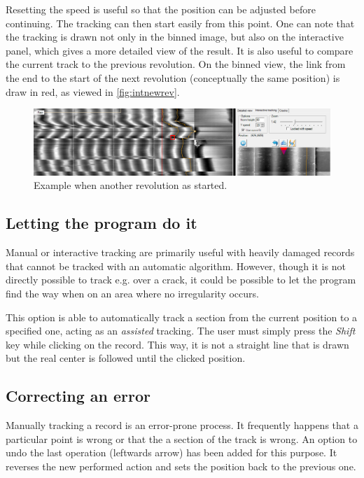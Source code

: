 Resetting the speed is useful so that the position can be adjusted before continuing. The tracking can then start easily from this point. One can note that the tracking is drawn not only in the binned image, but also on the interactive panel, which gives a more detailed view of the result. It is also useful to compare the current track to the previous revolution. On the binned view, the link from the end to the start of the next revolution (conceptually the same position) is draw in red, as viewed in \autoref{fig:intnewrev}.

\begin{figure}[!ht]
\centering
\includegraphics[width=1.0\textwidth]{images/int-new-rev}
\caption{Example when another revolution as started.}
\label{fig:intnewrev}
\end{figure}

\subsection{Letting the program do it}
\label{sec:assistracking}

Manual or interactive tracking are primarily useful with heavily damaged records that cannot be tracked with an automatic algorithm. However, though it is not directly possible to track e.g. over a crack, it could be possible to let the program find the way when on an area where no irregularity occurs.

This option is able to automatically track a section from the current position to a specified one, acting as an \emph{assisted} tracking. The user must simply press the \emph{Shift} key while clicking on the record. This way, it is not a straight line that is drawn but the real center is followed until the clicked position.

\subsection{Correcting an error}

Manually tracking a record is an error-prone process. It frequently happens that a particular point is wrong or that the a section of the track is wrong. An option to undo the last operation (leftwards arrow) has been added for this purpose. It reverses the new performed action and sets the position back to the previous one.

